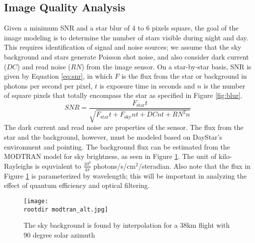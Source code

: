 \documentclass[twocolumn,letterpaper]{IEEEAerospace2012}
\newcommand{\rootdir}{./Figures/}
\newcommand{\RN}{\mathit{RN}}
\newcommand{\DC}{\mathit{DC}}
\newcommand{\SNR}{\mathit{SNR}}
\newcommand{\sub}[1]{\text{#1}} %
\begin{document}
\subsection{Image Quality Analysis}
Given a minimum SNR and a star blur of 4 to 6 pixels square, the goal of the image modeling is to determine the number of stars visible during night and day. This requires identification of signal and noise sources; we assume that the sky background and stars generate Poisson shot noise, and also consider dark current ($\DC$) and read noise ($\RN$) from the image sensor. On a star-by-star basis, SNR is given by Equation \ref{eq:snr}, in which $F$ is the flux from the star or background in photons per second per pixel, $t$ is exposure time in seconds and $n$ is the number of square pixels that totally encompass the star as specified in Figure \ref{fig:blur}.  
\begin{equation} 
    \label{eq:snr}
    \SNR = \frac{F_{\sub{star}}t}{\sqrt{F_{\sub{star}} t + F_{\sub{sky}} n t + \DC n t + \RN^2 n }}
\end{equation}
The dark current and read noise are properties of the sensor. The flux from the star and the background, however, must be modeled based on DayStar's environment and pointing. The background flux can be estimated from the MODTRAN model for sky brightness, as seen in Figure \ref{fig:modtran}. The unit of kilo-Rayleighs is equvialent to $\frac{10^{9}}{4\pi}$ photons/s/cm$^2$/steradian. Also note that the flux in Figure \ref{fig:modtran} is parameterized by wavelength; this will be important in analyzing the effect of quantum efficiency and optical filtering. %
\begin{figure}
    \label{fig:modtran}
    \texttt{[image: \\rootdir modtran\_alt.jpg]}
    \caption{The sky background is found by interpolation for a 38km flight with 90 degree solar azimuth}
\end{figure}
\end{document}
